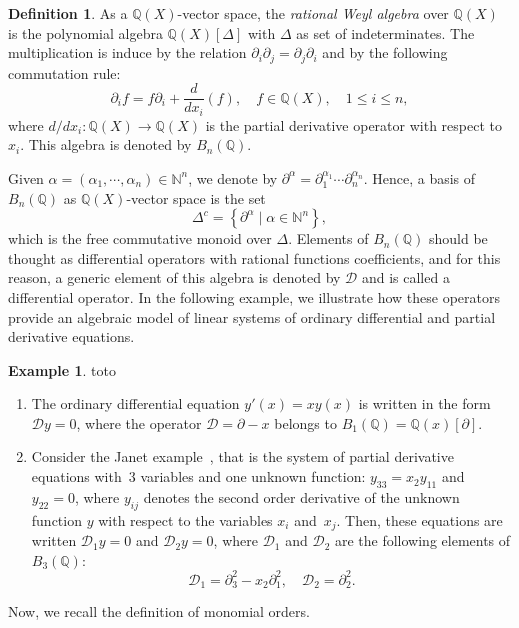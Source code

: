\documentclass[10pt]{easychair}
\theoremstyle{definition}
\newtheorem{definition}[theorem]{Definition}
\newtheorem{example}[theorem]{Example}
\newcommand\diff[1]{\partial_{#1}}
\newcommand\D{\mathcal{D}}
\newcommand\Q{\mathbb{Q}}
\newcommand\N{\mathbb{N}}
\newcommand\Weyl[1]{B_{#1}(\Q)}
\begin{document}
\begin{definition}
  As a $\Q(X)$-vector space, the {\it rational Weyl algebra} over $\Q(X)$
  is the polynomial algebra $\Q(X)[\Delta]$ with $\Delta$ as set of
  indeterminates. The multiplication is induce by the relation
  $\partial_i \partial_j = \partial_j \partial_i$ and by the following
  commutation rule:
  \[\diff{i}f=f\diff{i}+\frac{d}{dx_i}(f),\quad f\in\Q(X),\quad
  1\leq i\leq n,\]
  where $d/dx_i:\Q(X)\to\Q(X)$ is the partial derivative operator with
  respect to~$x_i$. This algebra is denoted by $\Weyl{n}$.
\end{definition}
\smallskip

Given $\alpha=(\alpha_1,\cdots,\alpha_n)\in\N^n$, we denote by 
$\partial^{\alpha}=\diff{1}^{\alpha_1}\cdots\diff{n}^{\alpha_n}$. Hence, 
a basis of $\Weyl{n}$ as $\Q(X)$-vector space is the set
\[\Delta^c=\left\{\partial^\alpha\mid\alpha\in\N^n\right\},\]
which is the free commutative monoid over $\Delta$. Elements of
$\Weyl{n}$ should be thought as differential operators with rational
functions coefficients, and for this reason, a generic element of this
algebra is denoted by $\D$ and is called a differential operator. In the
following example, we illustrate how these operators provide an algebraic
model of linear systems of ordinary differential and partial derivative
equations.
\smallskip

\begin{example}\label{ex:diff_operators_init}
  {\color{white}toto}
  \begin{enumerate}
  \item The ordinary differential equation $y'(x)=xy(x)$ is written in
    the form $\D y=0$, where the operator $\D=\partial-x$ belongs to
    $\Weyl{1}=\Q(x)[\partial]$.
  \item\label{it:Janet_example_init} Consider the Janet
    example~\cite{MR3532888}, that is the system of partial derivative
    equations with~$3$ variables and one unknown function:
    $y_{33}=x_2y_{11}$ and $y_{22}=0$, where $y_{ij}$ denotes the second
    order derivative of the unknown function $y$ with respect to the
    variables $x_i$ and~$x_j$. Then, these equations are written
    $\D_1y=0$ and $\D_2y=0$, where $\D_1$ and $\D_2$ are the following
    elements of $\Weyl{3}$:
    \[\D_1=\partial_3^2-x_2\partial_1^2,\quad \D_2=\partial_2^2.\]
  \end{enumerate}
\end{example}
\smallskip

Now, we recall the definition of monomial orders.
\smallskip
\end{document}
